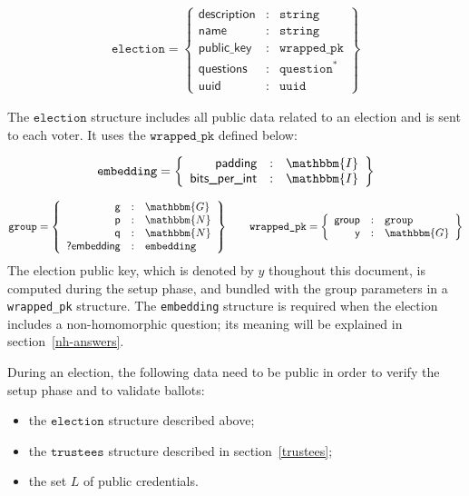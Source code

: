 \documentclass[a4paper]{article}
\newcommand{\G}{\mathbbm{G}}
\newcommand{\N}{\mathbbm{N}}
\newcommand{\I}{\mathbbm{I}}
\newcommand{\jstring}{\texttt{string}}
\newcommand{\election}{\texttt{election}}
\begin{document}
\begin{gather*}
  \election=\left\{
    \begin{array}{rcl}
      \textsf{description}&:&\jstring\\
      \textsf{name}&:&\jstring\\
      \textsf{public\_key}&:&\texttt{wrapped\_pk}\\
      \textsf{questions}&:&\texttt{question}^\ast\\
      \textsf{uuid}&:&\texttt{uuid}
    \end{array}
  \right\}
\end{gather*}

The $\election$ structure includes all public data related to an
election and is sent to each voter. It uses the $\texttt{wrapped\_pk}$
defined below:

\begin{gather*}
  \texttt{embedding}=\left\{
    \begin{array}{rcl}
      \textsf{padding}&:&\I\\
      \textsf{bits\_per\_int}&:&\I
    \end{array}
  \right\}
\end{gather*}

\begin{gather*}
  \texttt{group}=\left\{
    \begin{array}{rcl}
      \textsf{g}&:&\G\\
      \textsf{p}&:&\N\\
      \textsf{q}&:&\N\\
      \textsf{?embedding}&:&\texttt{embedding}
    \end{array}
  \right\}
  \qquad
  \texttt{wrapped\_pk}=\left\{
    \begin{array}{rcl}
      \textsf{group}&:&\texttt{group}\\
      \textsf{y}&:&\G
    \end{array}
  \right\}
\end{gather*}
The election public key, which is denoted by $y$ thoughout this
document, is computed during the setup phase, and bundled with the
group parameters in a \texttt{wrapped\_pk} structure. The
\texttt{embedding} structure is required when the election includes a
non-homomorphic question; its meaning will be explained in
section~\ref{nh-answers}.

During an election, the following data need to be public in order to
verify the setup phase and to validate ballots:
\begin{itemize}
\item the $\election$ structure described above;
\item the $\texttt{trustees}$ structure described in
  section~\ref{trustees};
\item the set $L$ of public credentials.
\end{itemize}
\end{document}
